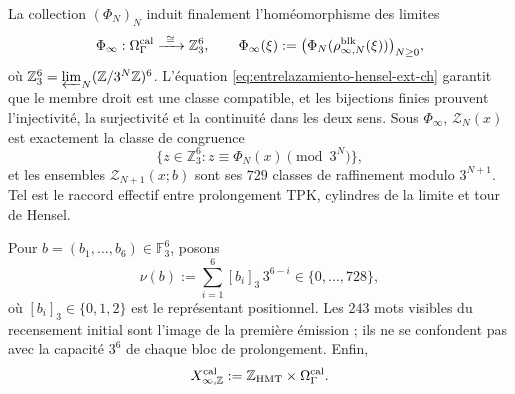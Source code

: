 La collection \((\Phi_N)_N\) induit finalement l'homéomorphisme des limites
\begin{equation}
 \Phi_\infty:\Omega_\Gamma^{\rm cal}
 \xrightarrow{\ \cong\ }\mathbb Z_3^6,\qquad
 \Phi_\infty(\xi):=
 \bigl(\Phi_N(\rho^{\rm blk}_{\infty,N}(\xi))\bigr)_{N\ge0},
 \label{eq:phi-infinito-hensel-ext-ch}
\end{equation}
où
\(\mathbb Z_3^6=\varprojlim_N(\mathbb Z/3^N\mathbb Z)^6\).
L’équation \eqref{eq:entrelazamiento-hensel-ext-ch} garantit que le membre
droit est une classe compatible, et les bijections finies prouvent
l’injectivité, la surjectivité et la continuité dans les deux sens. Sous
\(\Phi_\infty\), \(\mathscr Z_N(x)\) est exactement la classe de congruence
\[
 \{z\in\mathbb Z_3^6:z\equiv\Phi_N(x)\pmod{3^N}\},
\]
et les ensembles \(\mathscr Z_{N+1}(x;b)\) sont ses \(729\) classes de raffinement
modulo \(3^{N+1}\). Tel est le raccord effectif entre prolongement TPK,
cylindres de la limite et tour de Hensel.

Pour \(b=(b_1,\ldots,b_6)\in\mathbb F_3^6\), posons
\[
 \nu(b):=\sum_{i=1}^{6}[b_i]_3\,3^{6-i}
 \in\{0,\ldots,728\},
\tag{40c$_0$}
\label{eq:valor-bloque-ch}
\]
où \([b_i]_3\in\{0,1,2\}\) est le représentant positionnel. Les
\(243\) mots visibles du recensement initial sont l’image de la première
émission ; ils ne se confondent pas avec la capacité \(3^6\) de chaque bloc de
prolongement. Enfin,
\[
 X_{\infty,\mathbb Z}^{\rm cal}
 :=\mathbb Z_{\rm HMT}\times\Omega_\Gamma^{\rm cal}.
\]
